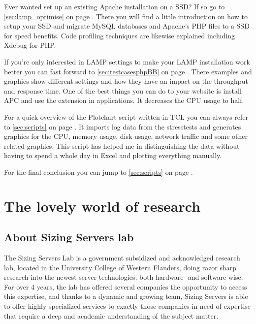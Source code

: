 Ever wanted set up an existing Apache installation on a SSD? If so go to \autoref{sec:lamp_optimise} on page \pageref{sec:lamp_optimise}. There you will find a little introduction on how to setup your SSD and migrate MySQL databases and Apache's PHP files to a SSD for speed benefits. 
Code profiling techniques are likewise explained including Xdebug for PHP.

If you're only interested in LAMP settings to make your LAMP installation work better you can fast forward to \autoref{sec:testcasesphpBB}  on page \pageref{sec:testcasesphpBB}.
There examples and graphics show different settings and how they have an impact on the throughput and response time.
One of the best things you can do to your website is install APC and use the extension in applications. It decreases the CPU usage to half.

For a quick overview of the Plotchart script written in TCL you can always refer to \autoref{sec:scripts}  on page \pageref{sec:scripts}. It imports log data from the stresstests and generates graphics for the CPU, memory usage, disk usage, network traffic and some other related graphics. 
This script has helped me in distinguishing the data without having to spend a whole day in Excel and plotting everything manually.

For the final conclusion you can jump to \autoref{sec:scripts}  on page \pageref{sec:scripts}.

\clearpage{}
\makeglossaries{}

\printglossaries{}
\clearpage{}



\tableofcontents{}
\clearpage

\pagestyle{headings}
\section{The lovely world of research}
\subsection{About Sizing Servers lab}
The Sizing Servers Lab is a government subsidized and acknowledged research lab, located in the University College of Western Flanders, 
doing razor sharp research into the newest server technologies, both hardware- and software-wise.
For over 4 years, the lab has offered several companies the opportunity to access this expertise, and thanks to a dynamic and growing team,
Sizing Servers is able to offer highly specialized services to exactly those companies in need of expertise that require a deep and academic understanding of the subject matter.

